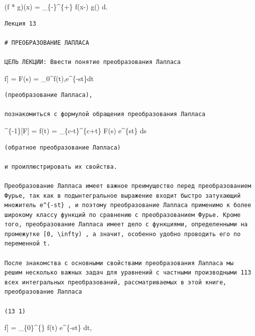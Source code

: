\documentclass[
  ukrainian,
]{article}
\begin{document}
(f * g)(x) =  \int\_\{-\infty\}\^{}\{+\infty\}
f(x-\xi) g(\xi) d\xi.

\begin{verbatim}
Лекция 13

# ПРЕОБРАЗОВАНИЕ ЛАПЛАСА

ЦЕЛЬ ЛЕКЦИИ: Ввести понятие преобразования Лапласа
\end{verbatim}

\mathscr{L}{[}f{]} = F(s) = \int\limits\_0\^{}\infty f(t),e\^{}\{-st\}dt

\begin{verbatim}
(преобразование Лапласа),

познакомиться с формулой обращения преобразования Лапласа
\end{verbatim}

\^{}\{-1\}{[}F{]} = f(t) = 
\int\_\{c-t\infty\}\^{}\{c+t\infty\} F(s) e\^{}\{st\} ds

\begin{verbatim}
(обратное преобразование Лапласа)

и проиллюстрировать их свойства.

Преобразование Лапласа имеет важное преимущество перед преобразованием Фурье, так как в подынтегральное выражение входит быстро затухающий множитель e^{-st} , и поэтому преобразование Лапласа применимо к более широкому классу функций по сравнению с преобразованием Фурье. Кроме того, преобразование Лапласа имеет дело с функциями, определенными на промежутке [0, \infty) , а значит, особенно удобно проводить его по переменной t.

После знакомства с основными свойствами преобразования Лапласа мы решим несколько важных задач для уравнений с частными производными 113 всех интегральных преобразований, рассматриваемых в этой книге, преобразование Лапласа

(13 1)
\end{verbatim}

\mathscr{Z}{[}f{]} = \int\_\{0\}\^{}\{\infty\} f(t) e\^{}\{-st\} dt,
\end{document}
